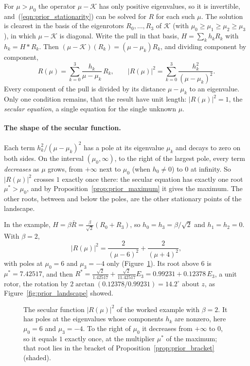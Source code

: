 \documentclass{birkjour}
\theoremstyle{definition}
\theoremstyle{remark}
\numberwithin{equation}{section}
\newcommand{\K}{\mathcal{K}}
\begin{document}
For $\mu > \mu_0$ the operator $\mu - \K$ has only positive eigenvalues, so it is invertible, and~(\ref{eqn:prior_stationarity}) can be solved for $R$ for each such $\mu$. The solution is clearest in the basis of the eigenrotors $R_0, \ldots, R_3$ of $\K$ (with $\mu_0 \geq \mu_1 \geq \mu_2 \geq \mu_3$), in which $\mu - \K$ is diagonal. Write the pull in that basis, $H = \sum_k h_k R_k$ with $h_k = H * R_k$. Then $(\mu - \K)(R_k) = (\mu - \mu_k) R_k$, and dividing component by component,
\begin{equation}
\label{eqn:prior_solution}
R(\mu) = \sum_{k=0}^3 \frac{h_k}{\mu - \mu_k}\, R_k, \qquad |R(\mu)|^2 = \sum_{k=0}^3 \frac{h_k^2}{(\mu - \mu_k)^2}.
\end{equation}
Every component of the pull is divided by its distance $\mu - \mu_k$ to an eigenvalue. Only one condition remains, that the result have unit length: $|R(\mu)|^2 = 1$, the \emph{secular equation}, a single equation for the single unknown $\mu$.

\paragraph{The shape of the secular function.} Each term $h_k^2 / (\mu - \mu_k)^2$ has a pole at its eigenvalue $\mu_k$ and decays to zero on both sides. On the interval $(\mu_0, \infty)$, to the right of the largest pole, every term \emph{decreases} as $\mu$ grows, from $+\infty$ next to $\mu_0$ (when $h_0 \neq 0$) to $0$ at infinity. So $|R(\mu)|^2$ crosses $1$ exactly once there: the secular equation has exactly one root $\mu^* > \mu_0$, and by Proposition~\ref{prop:prior_maximum} it gives the maximum. The other roots, between and below the poles, are the other stationary points of the landscape.

In the example, $H = \beta \bar R = \frac{\beta}{\sqrt 2} (R_0 + R_3)$, so $h_0 = h_3 = \beta / \sqrt 2$ and $h_1 = h_2 = 0$. With $\beta = 2$,
\begin{equation}
\label{eqn:prior_example_secular}
|R(\mu)|^2 = \frac{2}{(\mu - 6)^2} + \frac{2}{(\mu + 4)^2},
\end{equation}
with poles at $\mu_0 = 6$ and $\mu_3 = -4$ only (Figure~\ref{fig:prior_secular}). Its root above $6$ is $\mu^* = 7.42517$, and then $R^* = \frac{\sqrt 2}{1.42517} + \frac{\sqrt 2}{11.42517} E_3 = 0.99231 + 0.12378\, E_3$, a unit rotor, the rotation by $2 \arctan(0.12378 / 0.99231) = 14.2^\circ$ about $z$, as Figure~\ref{fig:prior_landscape} showed.

\begin{figure}[t]
\centering
{}
\caption{The secular function $|R(\mu)|^2$ of the worked example with $\beta = 2$. It has poles at the eigenvalues whose components $h_k$ are nonzero, here $\mu_0 = 6$ and $\mu_3 = -4$. To the right of $\mu_0$ it decreases from $+\infty$ to $0$, so it equals $1$ exactly once, at the multiplier $\mu^*$ of the maximum; that root lies in the bracket of Proposition~\ref{prop:prior_bracket} (shaded).}
\label{fig:prior_secular}
\end{figure}
\end{document}
